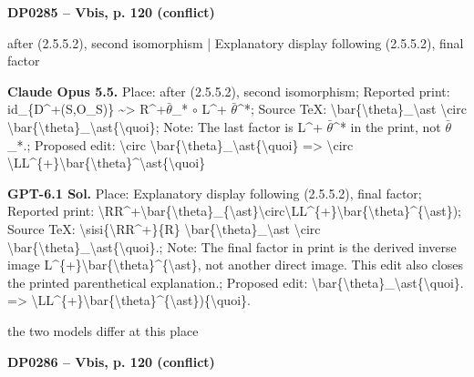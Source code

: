 \par\noindent\hypertarget{DP0285}{}\textbf{DP0285 -- Vbis, p. 120 (conflict)}\par
after (2.5.5.2), second isomorphism | Explanatory display following (2.5.5.2), final factor\par
\textbf{Claude Opus 5.5.} Place: after (2.5.5.2), second isomorphism; Reported print: id\_\{D\textasciicircum{}+(S,O\_S)\} \textasciitilde{}> R\textasciicircum{}+\ensuremath{\bar{\theta}}\_* \ensuremath{\circ} L\textasciicircum{}+ \ensuremath{\bar{\theta}}\textasciicircum{}*; Source TeX: \textbackslash{}bar\{\textbackslash{}theta\}\_\textbackslash{}ast \textbackslash{}circ \textbackslash{}bar\{\textbackslash{}theta\}\_\textbackslash{}ast\{\textbackslash{}quoi\}; Note: The last factor is L\textasciicircum{}+ \ensuremath{\bar{\theta}}\textasciicircum{}* in the print, not \ensuremath{\bar{\theta}}\_*.; Proposed edit: \textbackslash{}circ \textbackslash{}bar\{\textbackslash{}theta\}\_\textbackslash{}ast\{\textbackslash{}quoi\} =\allowbreak > \textbackslash{}circ \textbackslash{}LL\textasciicircum{}\{+\}\textbackslash{}bar\{\textbackslash{}theta\}\textasciicircum{}\textbackslash{}ast\{\textbackslash{}quoi\}\par
\textbf{GPT-6.1 Sol.} Place: Explanatory display following (2.5.5.2), final factor; Reported print: \textbackslash{}RR\textasciicircum{}+\textbackslash{}bar\{\textbackslash{}theta\}\_\{\textbackslash{}ast\}\textbackslash{}circ\textbackslash{}LL\textasciicircum{}\{+\}\textbackslash{}bar\{\textbackslash{}theta\}\textasciicircum{}\{\textbackslash{}ast\}); Source TeX: \textbackslash{}sisi\{\textbackslash{}RR\textasciicircum{}+\}\{R\} \textbackslash{}bar\{\textbackslash{}theta\}\_\textbackslash{}ast \textbackslash{}circ \textbackslash{}bar\{\textbackslash{}theta\}\_\textbackslash{}ast\{\textbackslash{}quoi\}.; Note: The final factor in print is the derived inverse image L\textasciicircum{}\{+\}\textbackslash{}bar\{\textbackslash{}theta\}\textasciicircum{}\{\textbackslash{}ast\}, not another direct image. This edit also closes the printed parenthetical explanation.; Proposed edit: \textbackslash{}bar\{\textbackslash{}theta\}\_\textbackslash{}ast\{\textbackslash{}quoi\}. =\allowbreak > \textbackslash{}LL\textasciicircum{}\{+\}\textbackslash{}bar\{\textbackslash{}theta\}\textasciicircum{}\{\textbackslash{}ast\})\{\textbackslash{}quoi\}.\par
the two models differ at this place\par
\par\noindent\hypertarget{DP0286}{}\textbf{DP0286 -- Vbis, p. 120 (conflict)}\par
